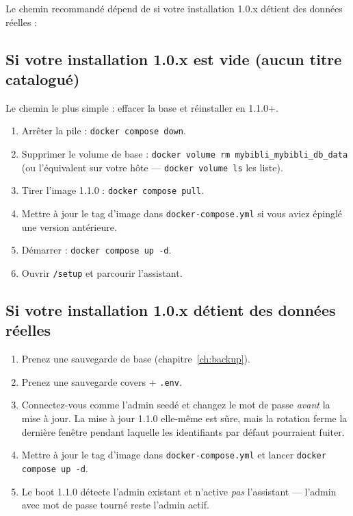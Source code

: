 Le chemin recommandé dépend de si votre installation 1.0.x détient
des données réelles :

\subsection*{Si votre installation 1.0.x est vide (aucun titre catalogué)}

Le chemin le plus simple : effacer la base et réinstaller en 1.1.0+.

\begin{enumerate}
  \item Arrêter la pile : \texttt{docker compose down}.
  \item Supprimer le volume de base :
        \texttt{docker volume rm mybibli\_mybibli\_db\_data}
        (ou l'équivalent sur votre hôte —
        \texttt{docker volume ls} les liste).
  \item Tirer l'image 1.1.0 : \texttt{docker compose pull}.
  \item Mettre à jour le tag d'image dans
        \texttt{docker-compose.yml} si vous aviez épinglé une
        version antérieure.
  \item Démarrer : \texttt{docker compose up -d}.
  \item Ouvrir \texttt{/setup} et parcourir l'assistant.
\end{enumerate}

\subsection*{Si votre installation 1.0.x détient des données réelles}

\begin{enumerate}
  \item Prenez une sauvegarde de base (chapitre~\ref{ch:backup}).
  \item Prenez une sauvegarde covers + \texttt{.env}.
  \item Connectez-vous comme l'admin seedé et changez le mot de
        passe \emph{avant} la mise à jour. La mise à jour 1.1.0
        elle-même est sûre, mais la rotation ferme la dernière
        fenêtre pendant laquelle les identifiants par défaut
        pourraient fuiter.
  \item Mettre à jour le tag d'image dans
        \texttt{docker-compose.yml} et lancer
        \texttt{docker compose up -d}.
  \item Le boot 1.1.0 détecte l'admin existant et n'active
        \emph{pas} l'assistant — l'admin avec mot de passe tourné
        reste l'admin actif.
\end{enumerate}

